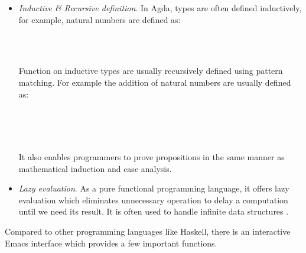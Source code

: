 \begin{itemize}
\item \textit{Inductive \& Recursive definition}. In Agda, types are often defined inductively, for example, natural numbers are defined as:

\begin{code}\>\<%
\>  \AgdaSymbol{:}  \<%
\\
\>[0]\<[2]%
\>[2] \AgdaSymbol{:} \<%
\\
\>[0]\<[2]%
\>[2] \<[7]%
\>[7]\AgdaSymbol{:} \AgdaSymbol{(} \AgdaSymbol{:} \AgdaSymbol{)}  \<%
\>\<\end{code}

Function on inductive types are usually recursively defined using pattern matching. For example the addition of natural numbers are usually defined as:

\begin{code}\>\<%
\\
\>\AgdaFunction{\_+\_} \AgdaSymbol{:}     \<%
\\
\> \<[6]%
\>[6]\AgdaFunction{+}  \AgdaSymbol{=} \<%
\\
\>  \AgdaFunction{+}  \AgdaSymbol{=}  \AgdaSymbol{(} \AgdaFunction{+} \AgdaSymbol{)}\<%
\>\<\end{code}

It also enables programmers to prove propositions in the same manner as mathematical induction and case analysis.

\item \textit{Lazy evaluation}\label{lazyeval}. As a pure functional programming language, it offers lazy evaluation which eliminates unnecessary operation to delay a computation until we need its result. It is often used to handle infinite data structures \cite{wiki:Lazy_evaluation}.

\end{itemize}

Compared to other programming languages like Haskell, there is an interactive Emacs interface which provides a few important functions.

